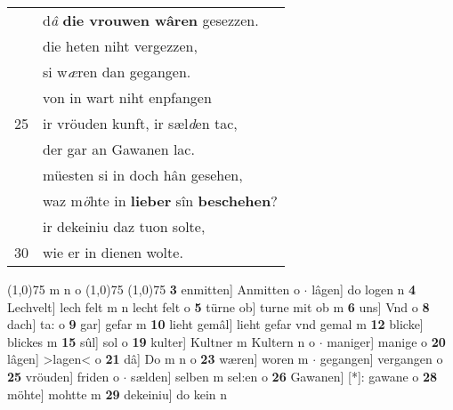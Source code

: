 \documentclass[8pt,a4paper,notitlepage]{article}
\begin{document}
\begin{table}[ht]
\begin{minipage}[t]{0.5\linewidth}
\begin{tabular}{rl}
 & d\textit{â} \textbf{die vrouwen wâren} gesezzen.\\ 
 & die heten niht vergezzen,\\ 
 & si w\textit{æ}ren dan gegangen.\\ 
 & von in wart niht enpfangen\\ 
25 & ir vröuden kunft, ir sæl\textit{d}en tac,\\ 
 & der gar an Gawanen lac.\\ 
 & müesten si in doch hân gesehen,\\ 
 & waz m\textit{ö}hte in \textbf{lieber} sîn \textbf{beschehen}?\\ 
 & ir dekeiniu daz tuon solte,\\ 
30 & wie er in dienen wolte.\\ 
\end{tabular}
\scriptsize
\line(1,0){75} \newline
m n o \newline
\line(1,0){75} \newline
\newline
\line(1,0){75} \newline
\textbf{3} enmitten] Anmitten o  $\cdot$ lâgen] do logen n \textbf{4} Lechvelt] lech felt m n lecht felt o \textbf{5} türne ob] turne mit ob m \textbf{6} uns] Vnd o \textbf{8} dach] ta: o \textbf{9} gar] gefar m \textbf{10} lieht gemâl] lieht gefar vnd gemal m \textbf{12} blicke] blickes m \textbf{15} sûl] sol o \textbf{19} kulter] Kultner m Kultern n o  $\cdot$ maniger] manige o \textbf{20} lâgen] >lagen< o \textbf{21} dâ] Do m n o \textbf{23} wæren] woren m  $\cdot$ gegangen] vergangen o \textbf{25} vröuden] friden o  $\cdot$ sælden] selben m sel:en o \textbf{26} Gawanen] [*]: gawane o \textbf{28} möhte] mohtte m \textbf{29} dekeiniu] do kein n \newline
\end{minipage}
\end{table}
\newpage
\end{document}
